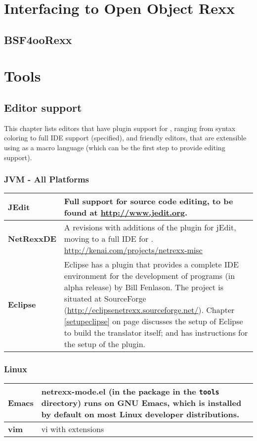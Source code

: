 \chapter{Interfacing to Open Object Rexx}
\section{BSF4ooRexx}

\chapter{\nr{}Tools}
\section{Editor support}\label{editors}
This chapter lists editors that have plugin support for \nr{},
ranging from syntax coloring to full IDE support (specified), and
\Rexx{} friendly editors, that are extensible using \Rexx{} as a macro
language (which can be the first step to provide \nr{} editing support).
\subsection{JVM - All Platforms}
\begin{tabularx}{\textwidth}{>{\bfseries}lX}
\toprule
JEdit & Full support for \nr{} source code editing, to be found at
\url{http://www.jedit.org}.
\\\midrule
NetRexxDE & A revisions with additions of the \nr{} plugin for
jEdit, moving to a full IDE for \nr{}. \url{http://kenai.com/projects/netrexx-misc} 
\\\midrule
Eclipse & Eclipse has a \nr{} plugin that provides a complete IDE
environment for the development of \nr{} programs (in alpha release)
by Bill Fenlason. The project is situated at SourceForge
(\url{http://eclipsenetrexx.sourceforge.net/}). Chapter
\ref{setupeclipse} on page \pageref{setupeclipse} discusses the setup
of Eclipse to build the translator itself; and has
instructions for the setup of the \nr{} plugin.
\\\bottomrule
\end{tabularx}
\subsection{Linux}
\begin{tabularx}{\textwidth}{>{\bfseries}lX}
\toprule
Emacs & netrexx-mode.el (in the \nr{} package in the \texttt{tools}
directory) runs on GNU Emacs, which is installed by default on most
Linux developer distributions.
\\\midrule
vim & vi with extensions
\\\bottomrule
\end{tabularx}
